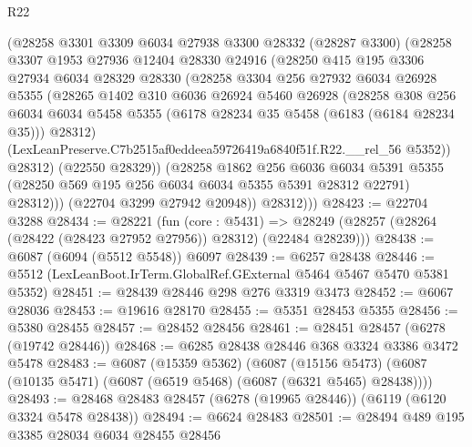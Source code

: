 \begin{lexlean}{R22}
\begin{coremodule}
            (@28258
              @3301
              @3309
              @6034
              @27938
              @3300
              @28332
              (@28287 @3300)
              (@28258
                @3307
                @1953
                @27936
                @12404
                @28330
                @24916
                (@28250
                  @415
                  @195
                  @3306
                  @27934
                  @6034
                  @28329
                  @28330
                  (@28258
                    @3304
                    @256
                    @27932
                    @6034
                    @26928
                    @5355
                    (@28265
                      @1402
                      @310
                      @6036
                      @26924
                      @5460
                      @26928
                      (@28258
                        @308
                        @256
                        @6034
                        @6034
                        @5458
                        @5355
                        (@6178 @28234 @35 @5458 (@6183 (@6184 @28234 @35)))
                        @28312)
                      (LexLeanPreserve.C7b2515af0eddeea59726419a6840f51f.R22.__rel_56 @5352))
                    @28312)
                  (@22550 @28329))
                (@28258
                  @1862
                  @256
                  @6036
                  @6034
                  @5391
                  @5355
                  (@28250 @569 @195 @256 @6034 @6034 @5355 @5391 @28312 @22791)
                  @28312)))
            (@22704 @3299 @27942 @20948))
          @28312)))
@28423 := @22704 @3288
@28434 := @28221
    (fun (core : @5431) =>
    @28249 (@28257 (@28264 (@28422 (@28423 @27952 @27956)) @28312) (@22484 @28239)))
@28438 := @6087 (@6094 (@5512 @5548)) @6097
@28439 := @6257 @28438
@28446 := @5512 (LexLeanBoot.IrTerm.GlobalRef.GExternal @5464 @5467 @5470 @5381 @5352)
@28451 := @28439 @28446 @298 @276 @3319 @3473
@28452 := @6067 @28036
@28453 := @19616 @28170
@28455 := @5351 @28453 @5355
@28456 := @5380 @28455
@28457 := @28452 @28456
@28461 := @28451 @28457 (@6278 (@19742 @28446))
@28468 := @6285 @28438 @28446 @368 @3324 @3386 @3472 @5478
@28483 := @6087
    (@15359 @5362)
    (@6087 (@15156 @5473) (@6087 (@10135 @5471) (@6087 (@6519 @5468) (@6087 (@6321 @5465) @28438))))
@28493 := @28468 @28483 @28457 (@6278 (@19965 @28446)) (@6119 (@6120 @3324 @5478 @28438))
@28494 := @6624 @28483
@28501 := @28494 @489 @195 @3385 @28034 @6034 @28455 @28456

\end{coremodule}
\end{lexlean}
